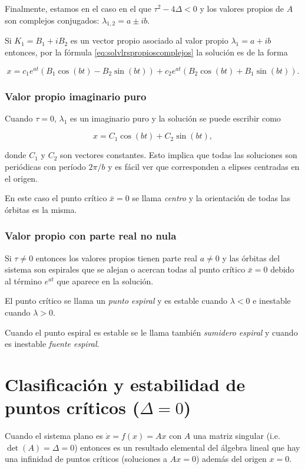 \documentclass[11pt]{book}
\theoremstyle{definition}
\numberwithin{definition}{section}
\theoremstyle{theorem}
\numberwithin{theorem}{section}
\numberwithin{lemma}{section}
\numberwithin{corollary}{section}
\theoremstyle{plain}
\numberwithin{example}{section}
\begin{document}
Finalmente, estamos en el caso en el que $\tau^2 - 4\Delta < 0$ y los valores propios de $A$ son complejos conjugados: $\lambda_{1,2} = a \pm ib$.

Si $K_1 = B_1 + iB_2$ es un vector propio asociado al valor propio $\lambda_1 = a + ib$ entonces, por la fórmula \ref{eq:solvlrspropioscomplejos} la solución es de la forma

$$ x = c_1 e^{a t}(B_1 \cos(bt) - B_2 \sin(bt)) + c_2 e^{a t}(B_2 \cos(bt) + B_1 \sin(bt)).$$

\subsubsection{Valor propio imaginario puro}
Cuando $\tau = 0$, $\lambda_1$ es un imaginario puro y la solución se puede escribir como

$$ x = C_1 \cos(bt) + C_2 \sin(bt), $$

donde $C_1$ y $C_2$ son vectores constantes. Esto implica que todas las soluciones son periódicas con período $2\pi / b$ y es fácil ver que corresponden a elipses centradas en el origen.

En este caso el punto crítico $\bar{x} = 0$ se llama \emph{centro} y la orientación de todas las órbitas es la misma.

\subsubsection{Valor propio con parte real no nula}

Si $\tau \neq 0$ entonces los valores propios tienen parte real $a \neq 0$ y las órbitas del sistema son espirales que se alejan o acercan todas al punto crítico $\bar{x} = 0$ debido al término $e^{a t}$ que aparece en la solución.

El punto crítico se llama un \emph{punto espiral} y es estable cuando $\lambda < 0$ e inestable cuando $\lambda > 0$.

Cuando el punto espiral es estable se le llama también \emph{sumidero espiral} y cuando es inestable \emph{fuente espiral}.


\section{Clasificación y estabilidad de puntos críticos ($\Delta = 0$)}

Cuando el sistema plano es $\dot{x} = f(x) = Ax$ con $A$ una matriz singular (i.e. $\det(A) = \Delta = 0$) entonces es un resultado elemental del álgebra lineal que hay una infinidad de puntos críticos (soluciones a $Ax = 0$) además del origen $x = 0$.
\end{document}
